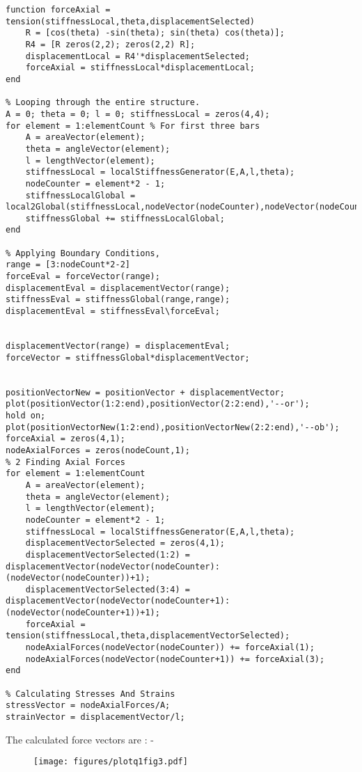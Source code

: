 \documentclass{article}
\begin{document}
\begin{verbatim}
function forceAxial = tension(stiffnessLocal,theta,displacementSelected)
    R = [cos(theta) -sin(theta); sin(theta) cos(theta)];
    R4 = [R zeros(2,2); zeros(2,2) R];
    displacementLocal = R4'*displacementSelected;
    forceAxial = stiffnessLocal*displacementLocal;
end

% Looping through the entire structure.
A = 0; theta = 0; l = 0; stiffnessLocal = zeros(4,4);
for element = 1:elementCount % For first three bars
    A = areaVector(element);
    theta = angleVector(element);
    l = lengthVector(element);
    stiffnessLocal = localStiffnessGenerator(E,A,l,theta);
    nodeCounter = element*2 - 1;
    stiffnessLocalGlobal = local2Global(stiffnessLocal,nodeVector(nodeCounter),nodeVector(nodeCounter+1),nodeCount);
    stiffnessGlobal += stiffnessLocalGlobal;
end

% Applying Boundary Conditions,
range = [3:nodeCount*2-2]
forceEval = forceVector(range);
displacementEval = displacementVector(range);
stiffnessEval = stiffnessGlobal(range,range);
displacementEval = stiffnessEval\forceEval;


displacementVector(range) = displacementEval;
forceVector = stiffnessGlobal*displacementVector;


positionVectorNew = positionVector + displacementVector;
plot(positionVector(1:2:end),positionVector(2:2:end),'--or');
hold on;
plot(positionVectorNew(1:2:end),positionVectorNew(2:2:end),'--ob');
forceAxial = zeros(4,1);
nodeAxialForces = zeros(nodeCount,1);
% 2 Finding Axial Forces
for element = 1:elementCount
    A = areaVector(element);
    theta = angleVector(element);
    l = lengthVector(element);
    nodeCounter = element*2 - 1;
    stiffnessLocal = localStiffnessGenerator(E,A,l,theta);
    displacementVectorSelected = zeros(4,1);
    displacementVectorSelected(1:2) = displacementVector(nodeVector(nodeCounter):(nodeVector(nodeCounter))+1);
    displacementVectorSelected(3:4) = displacementVector(nodeVector(nodeCounter+1):(nodeVector(nodeCounter+1))+1);
    forceAxial = tension(stiffnessLocal,theta,displacementVectorSelected);
    nodeAxialForces(nodeVector(nodeCounter)) += forceAxial(1);
    nodeAxialForces(nodeVector(nodeCounter+1)) += forceAxial(3);
end

% Calculating Stresses And Strains
stressVector = nodeAxialForces/A;
strainVector = displacementVector/l;

\end{verbatim}
The calculated force vectors are : - 

\begin{figure}
    \begin{center}
        \texttt{[image: figures/plotq1fig3.pdf]}
    \end{center}
\end{figure}
\end{document}

